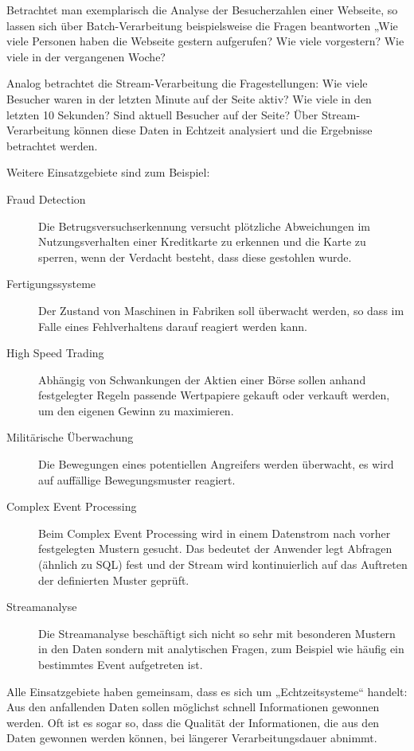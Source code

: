 \documentclass[a4paper,11pt]{scrartcl}
\begin{document}
  Betrachtet man exemplarisch die Analyse der Besucherzahlen einer Webseite, so
  lassen sich über Batch-Verarbeitung beispielsweise die Fragen beantworten „Wie
  viele Personen haben die Webseite gestern aufgerufen? Wie viele vorgestern?
  Wie viele in der vergangenen Woche?

  Analog betrachtet die Stream-Verarbeitung die Fragestellungen: Wie viele
  Besucher waren in der letzten Minute auf der Seite aktiv? Wie viele in den
  letzten 10 Sekunden? Sind aktuell Besucher auf der Seite? Über
  Stream-Verarbeitung können diese Daten in Echtzeit analysiert und die Ergebnisse
  betrachtet werden.

  Weitere Einsatzgebiete sind zum Beispiel:\cite[S.~465ff.]{kleppmann17}
  \begin{description}
    \item[Fraud Detection] Die Betrugsversuchserkennung versucht plötzliche
      Abweichungen im Nutzungsverhalten einer Kreditkarte zu erkennen und die
      Karte zu sperren, wenn der Verdacht besteht, dass diese gestohlen wurde.
    \item[Fertigungssysteme] Der Zustand von Maschinen in Fabriken soll
      überwacht werden, so dass im Falle eines Fehlverhaltens darauf reagiert
      werden kann.
    \item[High Speed Trading] Abhängig von Schwankungen der Aktien einer Börse
      sollen anhand festgelegter Regeln passende Wertpapiere gekauft oder
      verkauft werden, um den eigenen Gewinn zu maximieren.
    \item[Militärische Überwachung] Die Bewegungen eines potentiellen
      Angreifers werden überwacht, es wird auf auffällige Bewegungsmuster
      reagiert.
    \item[Complex Event Processing] Beim Complex Event Processing wird in einem
      Datenstrom nach vorher festgelegten Mustern gesucht. Das bedeutet der
      Anwender legt Abfragen (ähnlich zu SQL) fest und der Stream wird
      kontinuierlich auf das Auftreten der definierten Muster geprüft.
    \item[Streamanalyse] Die Streamanalyse beschäftigt sich nicht so sehr mit
      besonderen Mustern in den Daten sondern mit analytischen Fragen, zum
      Beispiel wie häufig ein bestimmtes Event aufgetreten ist.
  \end{description}

  Alle Einsatzgebiete haben gemeinsam, dass es sich um „Echtzeitsysteme“ handelt:
  Aus den anfallenden Daten sollen möglichst schnell Informationen gewonnen
  werden. Oft ist es sogar so, dass die Qualität der Informationen, die aus den
  Daten gewonnen werden können, bei längerer Verarbeitungsdauer abnimmt.
\end{document}
